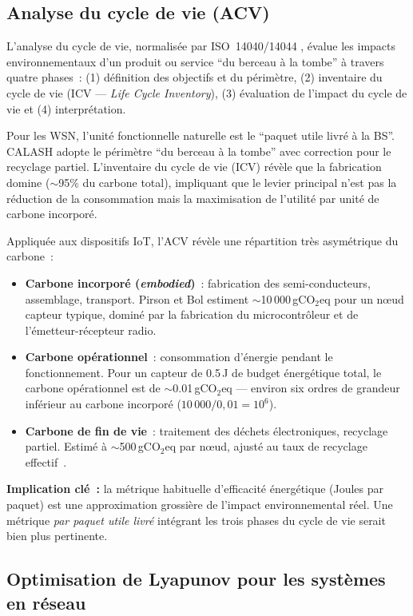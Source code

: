 \subsection{Analyse du cycle de vie (ACV)}

L'analyse du cycle de vie, normalisée par ISO~14040/14044 \cite{iso14040}, évalue les impacts environnementaux d'un produit ou service ``du berceau à la tombe'' à travers quatre phases~: (1) définition des objectifs et du périmètre, (2) inventaire du cycle de vie (ICV --- \emph{Life Cycle Inventory}), (3) évaluation de l'impact du cycle de vie et (4) interprétation.

Pour les WSN, l'unité fonctionnelle naturelle est le ``paquet utile livré à la BS''. CALASH adopte le périmètre ``du berceau à la tombe'' avec correction pour le recyclage partiel. L'inventaire du cycle de vie (ICV) révèle que la fabrication domine ($\sim$95\% du carbone total), impliquant que le levier principal n'est pas la réduction de la consommation mais la maximisation de l'utilité par unité de carbone incorporé.

Appliquée aux dispositifs IoT, l'ACV révèle une répartition très asymétrique du carbone~:
\begin{itemize}
    \item \textbf{Carbone incorporé (\emph{embodied})}~: fabrication des semi-conducteurs, assemblage, transport. Pirson et Bol \cite{pirson2021embodied} estiment $\sim$10\,000\,gCO$_2$eq pour un n\oe{}ud capteur typique, dominé par la fabrication du microcontrôleur et de l'émetteur-récepteur radio.
    \item \textbf{Carbone opérationnel}~: consommation d'énergie pendant le fonctionnement. Pour un capteur de 0.5\,J de budget énergétique total, le carbone opérationnel est de $\sim$0.01\,gCO$_2$eq --- environ six ordres de grandeur inférieur au carbone incorporé ($10\,000/0{,}01 = 10^6$).
    \item \textbf{Carbone de fin de vie}~: traitement des déchets électroniques, recyclage partiel. Estimé à $\sim$500\,gCO$_2$eq par n\oe{}ud, ajusté au taux de recyclage effectif~\cite{pirson2021embodied}.
\end{itemize}

\textbf{Implication clé~:} la métrique habituelle d'efficacité énergétique (Joules par paquet) est une approximation grossière de l'impact environnemental réel. Une métrique \emph{par paquet utile livré} intégrant les trois phases du cycle de vie serait bien plus pertinente.

\subsection{Optimisation de Lyapunov pour les systèmes en réseau}

